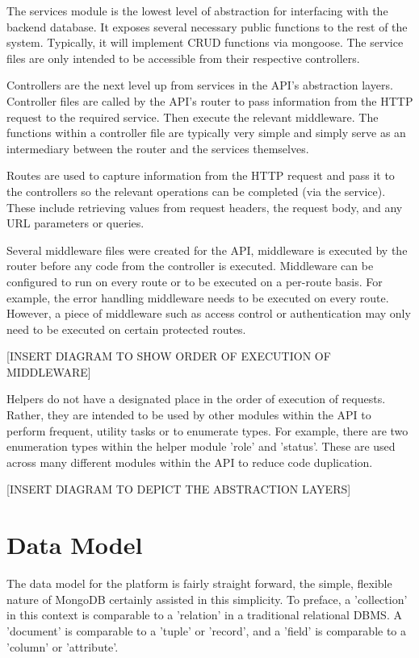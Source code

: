 The services module is the lowest level of abstraction for interfacing with the backend database. It exposes several necessary public functions to the rest of the system. Typically, it will implement CRUD functions via mongoose. The service files are only intended to be accessible from their respective controllers.

Controllers are the next level up from services in the API's abstraction layers. Controller files are called by the API's router to pass information from the HTTP request to the required service. Then execute the relevant middleware. The functions within a controller file are typically very simple and simply serve as an intermediary between the router and the services themselves.

Routes are used to capture information from the HTTP request and pass it to the controllers so the relevant operations can be completed (via the service).  These include retrieving values from request headers, the request body, and any URL parameters or queries.

Several middleware files were created for the API, middleware is executed by the router before any code from the controller is executed. Middleware can be configured to run on every route or to be executed on a per-route basis. For example, the error handling middleware needs to be executed on every route. However, a piece of middleware such as access control or authentication may only need to be executed on certain protected routes.

[INSERT DIAGRAM TO SHOW ORDER OF EXECUTION OF MIDDLEWARE]

Helpers do not have a designated place in the order of execution of requests. Rather, they are intended to be used by other modules within the API to perform frequent, utility tasks or to enumerate types. For example, there are two enumeration types within the helper module 'role' and 'status'. These are used across many different modules within the API to reduce code duplication.

[INSERT DIAGRAM TO DEPICT THE ABSTRACTION LAYERS]

\section{Data Model}
The data model for the platform is fairly straight forward, the simple, flexible nature of MongoDB certainly assisted in this simplicity. To preface, a 'collection' in this context is comparable to a 'relation' in a traditional relational DBMS. A 'document' is comparable to a 'tuple' or 'record', and a 'field' is comparable to a 'column' or 'attribute'.

